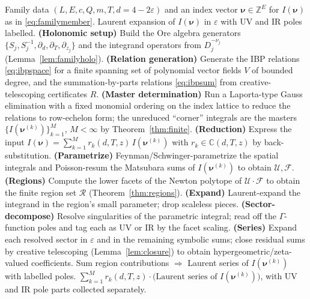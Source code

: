\documentclass{amsart}
\theoremstyle{definition}
\begin{document}
\begin{algorithm}[H]
\caption{\textsc{ThermalSumInt}: uniform reduction and evaluation of a
multi-loop thermal sum-integral}\label{alg:main}
\begin{algorithmic}[1]
\Require Family data $(L,E,c,Q,m,T,d{=}4{-}2\varepsilon)$ and an index vector
$\boldsymbol\nu\in\mathbb Z^E$ for $I(\boldsymbol\nu)$ as in
\eqref{eq:familymember}.
\Ensure Laurent expansion of $I(\boldsymbol\nu)$ in $\varepsilon$ with UV and
IR poles labelled.
\State \textbf{(Holonomic setup)} Build the Ore algebra generators
$\{S_j,S_j^{-1},\partial_d,\partial_T,\partial_{z_j}\}$ and the integrand
operators from $D_j^{-\nu_j}$ (Lemma~\ref{lem:familyholo}).
\State \textbf{(Relation generation)} Generate the IBP relations
\eqref{eq:ibpspace} for a finite spanning set of polynomial vector fields $V$
of bounded degree, and the summation-by-parts relations \eqref{eq:ibpsum} from
creative-telescoping certificates $R$.
\State \textbf{(Master determination)} Run a Laporta-type Gauss elimination
with a fixed monomial ordering on the index lattice to reduce the relations to
row-echelon form; the unreduced ``corner'' integrals are the masters
$\{I(\boldsymbol\nu^{(k)})\}_{k=1}^{M}$, $M<\infty$ by
Theorem~\ref{thm:finite}.
\State \textbf{(Reduction)} Express the input
$I(\boldsymbol\nu)=\sum_{k=1}^{M} r_k(d,T,z)\,I(\boldsymbol\nu^{(k)})$ with
$r_k\in\mathbb C(d,T,z)$ by back-substitution.
  \State \textbf{(Parametrize)} Feynman/Schwinger-parametrize the spatial
  integrals and Poisson-resum the Matsubara sums of $I(\boldsymbol\nu^{(k)})$
  to obtain $\mathcal U,\mathcal F$.
  \State \textbf{(Regions)} Compute the lower facets of the Newton polytope of
  $\mathcal U\cdot\mathcal F$ to obtain the finite region set $\mathcal R$
  (Theorem~\ref{thm:regions}).
    \State \textbf{(Expand)} Laurent-expand the integrand in the region's small
    parameter; drop scaleless pieces.
    \State \textbf{(Sector-decompose)} Resolve singularities of the parametric
    integral; read off the $\Gamma$-function poles and tag each as UV or IR by
    the facet scaling.
    \State \textbf{(Series)} Expand each resolved sector in $\varepsilon$ and
    in the remaining symbolic sums; close residual sums by creative
    telescoping (Lemma~\ref{lem:closure}) to obtain hypergeometric/zeta-valued
    coefficients.
  \EndFor
  \State Sum region contributions $\Rightarrow$ Laurent series of
  $I(\boldsymbol\nu^{(k)})$ with labelled poles.
\EndFor
\State \Return $\sum_{k=1}^M r_k(d,T,z)\cdot
\big(\text{Laurent series of }I(\boldsymbol\nu^{(k)})\big)$, with UV and IR
pole parts collected separately.
\end{algorithmic}
\end{algorithm}
\end{document}
